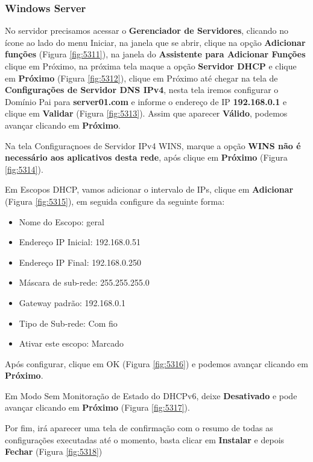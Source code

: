 \documentclass[10pt]{article}
\begin{document}
\subsubsection{Windows Server}
\par No servidor precisamos acessar o \textbf{Gerenciador de Servidores}, clicando no ícone ao lado do menu Iniciar, na janela que se abrir, clique na opção \textbf{Adicionar funções} (Figura \ref{fig:5311}), na janela do \textbf{Assistente para Adicionar Funções} clique em Próximo, na próxima tela maque a opção \textbf{Servidor DHCP} e clique em \textbf{Próximo} (Figura \ref{fig:5312}), clique em Próximo até chegar na tela de \textbf{Configurações de Servidor DNS IPv4}, nesta tela iremos configurar o Domínio Pai para \textbf{server01.com} e informe o endereço de IP \textbf{192.168.0.1} e clique em \textbf{Validar} (Figura \ref{fig:5313}). Assim que aparecer \textbf{Válido}, podemos avançar clicando em \textbf{Próximo}.
\par Na tela Configuraçnoes de Servidor IPv4 WINS, marque a opção \textbf{WINS não é necessário aos aplicativos desta rede}, após clique em \textbf{Próximo} (Figura \ref{fig:5314}).
\par Em Escopos DHCP, vamos adicionar o intervalo de IPs, clique em \textbf{Adicionar} (Figura \ref{fig:5315}), em seguida configure da seguinte forma:
\begin{itemize}
    \item Nome do Escopo: geral
    \item Endereço IP Inicial: 192.168.0.51
    \item Endereço IP Final: 192.168.0.250
    \item Máscara de sub-rede: 255.255.255.0
    \item Gateway padrão: 192.168.0.1
    \item Tipo de Sub-rede: Com fio
    \item Ativar este escopo: Marcado
\end{itemize}
\par Após configurar, clique em OK (Figura \ref{fig:5316}) e podemos avançar clicando em \textbf{Próximo}.
\par Em Modo Sem Monitoração de Estado do DHCPv6, deixe \textbf{Desativado} e pode avançar clicando em \textbf{Próximo}  (Figura \ref{fig:5317}).
\par Por fim, irá aparecer uma tela de confirmação com o resumo de todas as configurações executadas até o momento, basta clicar em \textbf{Instalar} e depois \textbf{Fechar} (Figura \ref{fig:5318})
\end{document}
